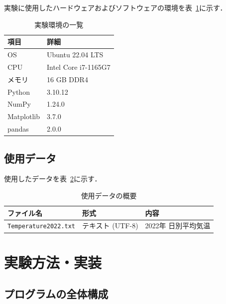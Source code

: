 \documentclass[12pt,a4paper]{ltjsarticle}
\begin{document}
実験に使用したハードウェアおよびソフトウェアの環境を表~\ref{tab:env}に示す．

\begin{table}[htbp]
  \centering
  \caption{実験環境の一覧}\label{tab:env}
  \begin{tabular}{ll}
    \toprule
    \textbf{項目}    & \textbf{詳細} \\
    \midrule
    OS               & Ubuntu 22.04 LTS \\
    CPU              & Intel Core i7-1165G7 \\ %
    メモリ           & 16 GB DDR4 \\
    Python           & 3.10.12 \\
    NumPy            & 1.24.0 \\
    Matplotlib       & 3.7.0 \\
    pandas           & 2.0.0 \\
    \bottomrule
  \end{tabular}
\end{table}

\subsection{使用データ}

使用したデータを表~\ref{tab:data}に示す．

\begin{table}[htbp]
  \centering
  \caption{使用データの概要}\label{tab:data}
  \begin{tabular}{lll}
    \toprule
    \textbf{ファイル名}       & \textbf{形式}   & \textbf{内容} \\
    \midrule
    \texttt{Temperature2022.txt} & テキスト (UTF-8) & 2022年 日別平均気温 \\
    \bottomrule
  \end{tabular}
\end{table}

\section{実験方法・実装}\label{sec:method}

\subsection{プログラムの全体構成}
\end{document}
